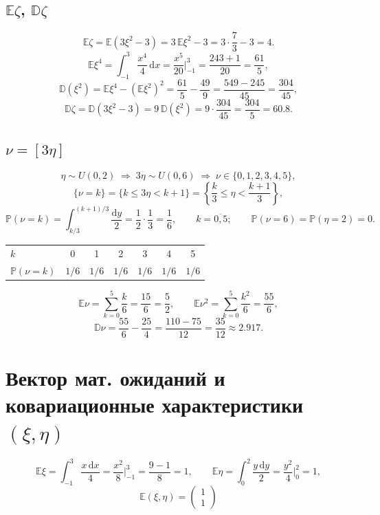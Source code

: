\documentclass[12pt]{article}
\begin{document}
\subsection{$\mathbb{E}\zeta$, $\mathbb{D}\zeta$}

\[
    \mathbb{E}\zeta = \mathbb{E}(3\xi^2-3) = 3\,\mathbb{E}\xi^2 - 3
    = 3\cdot\frac{7}{3} - 3 = 4.
\]
\[
    \mathbb{E}\xi^4 = \int_{-1}^{3} \frac{x^4}{4}\,\mathrm{d}x
    = \frac{x^5}{20}\bigg|_{-1}^{3} = \frac{243+1}{20} = \frac{61}{5},
\]
\[
    \mathbb{D}(\xi^2) = \mathbb{E}\xi^4 - \left(\mathbb{E}\xi^2\right)^2
    = \frac{61}{5} - \frac{49}{9} = \frac{549-245}{45} = \frac{304}{45},
\]
\[
    \mathbb{D}\zeta = \mathbb{D}(3\xi^2-3) = 9\,\mathbb{D}(\xi^2)
    = 9\cdot\frac{304}{45} = \frac{304}{5} = 60.8.
\]

\subsection{$\nu = [3\eta]$}

\[
    \eta \sim U(0,2) \;\Rightarrow\; 3\eta \sim U(0,6) \;\Rightarrow\; \nu \in \{0,1,2,3,4,5\},
\]
\[
    \{\nu = k\} = \{k \le 3\eta < k+1\} = \left\{\frac{k}{3} \le \eta < \frac{k+1}{3}\right\},
\]
\[
    \mathbb{P}(\nu = k) = \int_{k/3}^{(k+1)/3} \frac{\mathrm{d}y}{2} = \frac{1}{2}\cdot\frac{1}{3}
    = \frac{1}{6}, \qquad k = \overline{0,5}; \qquad \mathbb{P}(\nu = 6) = \mathbb{P}(\eta = 2) = 0.
\]

\begin{center}
\begin{tabular}{l|cccccc}
    \toprule
    $k$ & 0 & 1 & 2 & 3 & 4 & 5 \\
    $\mathbb{P}(\nu = k)$ & $1/6$ & $1/6$ & $1/6$ & $1/6$ & $1/6$ & $1/6$ \\
    \bottomrule
\end{tabular}
\end{center}


\[
    \mathbb{E}\nu = \sum_{k=0}^{5} \frac{k}{6} = \frac{15}{6} = \frac{5}{2}, \qquad
    \mathbb{E}\nu^2 = \sum_{k=0}^{5} \frac{k^2}{6} = \frac{55}{6},
\]
\[
    \mathbb{D}\nu = \frac{55}{6} - \frac{25}{4} = \frac{110-75}{12} = \frac{35}{12} \approx 2.917.
\]

\section{Вектор мат. ожиданий и ковариационные характеристики $(\xi,\eta)$}

\[
    \mathbb{E}\xi = \int_{-1}^{3} \frac{x\,\mathrm{d}x}{4} = \frac{x^2}{8}\bigg|_{-1}^{3} = \frac{9-1}{8} = 1,
    \qquad
    \mathbb{E}\eta = \int_{0}^{2} \frac{y\,\mathrm{d}y}{2} = \frac{y^2}{4}\bigg|_{0}^{2} = 1,
\]
\[
    \boxed{\; \mathbb{E}(\xi,\eta) = \begin{pmatrix} 1 \\ 1 \end{pmatrix} \;}
\]
\end{document}

